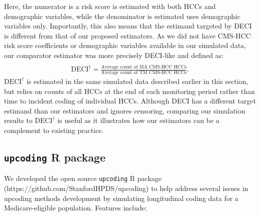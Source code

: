 \documentclass[
  12pt,
  number]{elsarticle}
\begin{document}
Here, the numerator is a risk score is estimated with both HCCs and
demographic variables, while the denominator is estimated uses
demographic variables only. Importantly, this also means that the
estimand targeted by DECI is different from that of our proposed
estimators. As we did not have CMS-HCC risk score coefficients or
demographic variables available in our simulated data, our comparator
estimator was more precisely DECI-like and defined as: \[
\begin{aligned}
\\ \text{DECI}^\dagger = \frac{\text{Average count of MA CMS-HCC HCCs}}{\text{Average count of TM CMS-HCC HCCs}}.
\end{aligned}
\]\(\text{DECI}^\dagger\) is estimated in the same simulated data
described earlier in this section, but relies on counts of all HCCs at
the end of each monitoring period rather than time to incident coding of
individual HCCs. Although DECI has a different target estimand than our
estimators and ignores censoring, comparing our simulation results to
\(\text{DECI}^\dagger\) is useful as it illustrates how our estimators
can be a complement to existing practice.

\subsection{\texorpdfstring{\texttt{upcoding} R
package}{upcoding R package}}\label{upcoding-r-package}

We developed the open source \texttt{upcoding} R package
(https://github.com/StanfordHPDS/upcoding) to help address several
issues in upcoding methods development by simulating longitudinal coding
data for a Medicare-eligible population. Features include:
\end{document}
